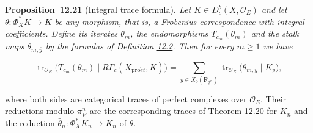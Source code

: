 \documentclass[11pt]{article}
\newenvironment{bpstatement}[2]{\par\addvspace{0.6\baselineskip}\noindent\textbf{#1}#2\textbf{.}\enspace\ignorespaces}
  {\par\addvspace{0.4\baselineskip}}
\newenvironment{bpstatementit}[2]{\begin{bpstatement}{#1}{#2}\itshape\ignorespaces}{\end{bpstatement}}
\providecommand{\Dbc}{}\renewcommand{\Dbc}{D^b_c}
\begin{document}
\label{bp66}%
\begin{bpstatementit}{Proposition~12.21}{ (Integral trace formula)}
Let \(K\in\Dbc(X,\mathcal O_E)\) and let \(\theta:\Phi_X^*K\to K\) be any morphism, that is, a Frobenius correspondence with integral coefficients. Define its iterates \(\theta_m\), the endomorphisms \(T_{c_m}(\theta_m)\) and the stalk maps \(\theta_{m,\bar y}\) by the formulas of Definition \hyperref[bp7]{12.2}. Then for every \(m\geq1\) we have

\[
\operatorname{tr}_{\mathcal O_E}
\bigl(T_{c_m}(\theta_m)\mid R\Gamma_c(X_{\mathrm{pro}\acute{e}t},K)\bigr)
=\sum_{y\in X_0(\mathbf F_{q^m})}
\operatorname{tr}_{\mathcal O_E}
\bigl(\theta_{m,\bar y}\mid K_{\bar y}\bigr),
\tag{12.1}
\]

where both sides are categorical traces of perfect complexes over \(\mathcal O_E\). Their reductions modulo \(\pi_E^n\) are the corresponding traces of Theorem \hyperref[bp62]{12.20} for \(K_n\) and the reduction \(\bar\theta_n:\Phi_X^*K_n\to K_n\) of \(\theta\).
\end{bpstatementit}
\end{document}
